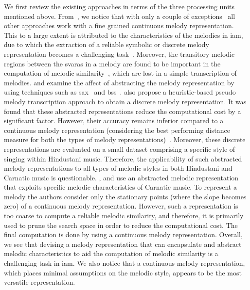 We first review the existing approaches in terms of the three processing units mentioned above. From~, we notice that with only a couple of exceptions~\citep{Ross2012b,ganguli2015efficient} all other approaches work with a fine grained continuous melody representation. This to a large extent is attributed to the characteristics of the melodies in \gls{iam}, due to which the extraction of a reliable symbolic or discrete melody representation becomes a challenging task~\citep{widdess1994involving}. Moreover, the transitory melodic regions between the \glspl{svara} in a melody are found to be important in the computation of melodic similarity~\citep{Datta2007,gupta2012objective}, which are lost in a simple transcription of melodies. \cite{Ross2012b} and \cite{ganguli2015efficient} examine the affect of abstracting the melody representation by using techniques such as \gls{sax}~\citep{Lin2003} and \gls{bss}~\citep{tanaka2005discovery}. \cite{ganguli2015efficient} also propose a heuristic-based pseudo melody transcription approach to obtain a discrete melody representation. It was found that these abstracted representations reduce the computational cost by a significant factor. However, their accuracy remains inferior compared to a continuous melody representation (considering the best performing distance measure for both the types of melody representations)~\citep{Ross2012b,ganguli2015efficient}. Moreover, these discrete representations are evaluated on a small dataset comprising a specific style of singing within Hindustani music. Therefore, the applicability of such abstracted melody representations to all types of melodic styles in both Hindustani and Carnatic music is questionable. \cite{Ishwar2013}, \cite{Dutta2014} and \cite{dutta2014modified} use an abstracted melodic representation that exploits specific melodic characteristics of Carnatic music. To represent a melody the authors consider only the stationary points (where the slope becomes zero) of a continuous melody representation. However, such a representation is too coarse to compute a reliable melodic similarity, and therefore, it is primarily used to prune the search space in order to reduce the computational cost. The final computation is done by using a continuous melody representation. Overall, we see that devising a melody representation that can encapsulate and abstract melodic characteristics to aid the computation of melodic similarity is a challenging task in \gls{iam}. We also notice that a continuous melody representation, which places minimal assumptions on the melodic style, appears to be the most versatile representation. 

